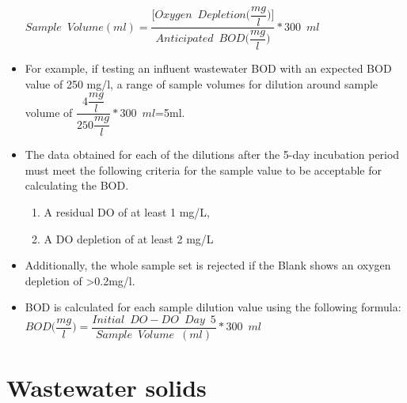 \begin{itemize}
\textbf{$Sample \enspace Volume (ml) = \dfrac{\Big[Oxygen \enspace Depletion \Big(\dfrac{mg}{l}\Big)\Big]}{Anticipated \enspace BOD \Big(\dfrac{mg}{l}\Big)}*300 \enspace ml$}\\

\vspace{0.4cm}
\item For example, if testing an influent wastewater BOD with an expected BOD value of 250 mg/l, a range of sample volumes for dilution around sample volume of $\dfrac{4\dfrac{mg}{l}}{250 \dfrac{mg}{l}}*300 \enspace ml$=5ml.\\
\vspace{0.4cm}
\item The data obtained for each of the dilutions after the 5-day incubation period must meet the following criteria for the sample value to be acceptable for calculating the BOD.\\
\vspace{0.4cm}

\begin{enumerate}[1.]
\setlength\itemsep{1em}

\item A residual DO of at least 1 mg/L,
\item A DO depletion of at least 2 mg/L
\end{enumerate}
\vspace{0.4cm}
\item Additionally, the whole sample set is rejected if the Blank shows an oxygen depletion of >0.2mg/l.\\
\vspace{0.4cm}
\item BOD is calculated for each sample dilution value using the following formula:\\
\vspace{0.4cm}
\textbf{$BOD \Big(\dfrac{mg}{l}\Big) = \dfrac{Initial \enspace DO - DO \enspace Day \enspace 5}{Sample \enspace Volume \enspace (ml)}*300 \enspace ml$}\\



\end{itemize}
\vspace{0.4cm}
\section{Wastewater solids}

